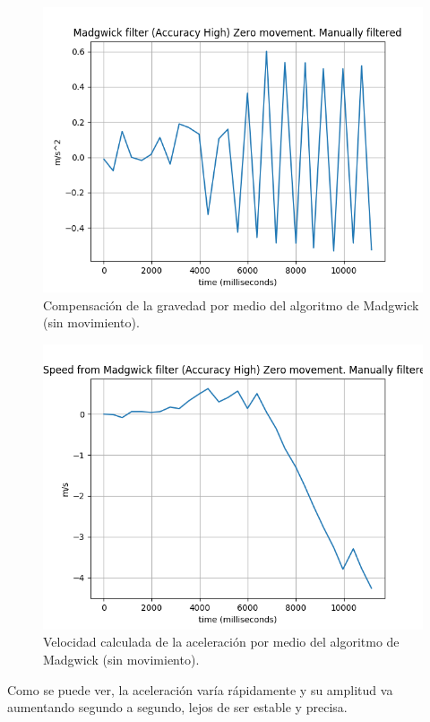 \begin{figure}[H]
	\centering
	\includegraphics[scale=0.5]{imagenes/madwickZero.png}
	\caption{Compensación de la gravedad por medio del algoritmo de Madgwick (sin movimiento).}
	\label{Movimiento cero Madgwick}
\end{figure}


\begin{figure}[H]
	\centering
	\includegraphics[scale=0.5]{imagenes/madwickZeroSpeed.png}
	\caption{Velocidad calculada de la aceleración por medio del algoritmo de Madgwick (sin movimiento).}
	\label{Velocidad cero Madgwick}
\end{figure}
\noindent
Como se puede ver, la aceleración varía rápidamente y su amplitud va aumentando segundo a segundo, lejos de ser estable y precisa.

